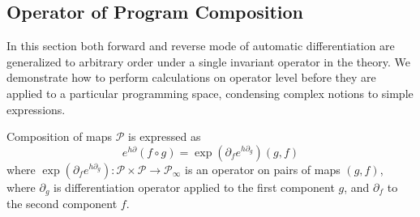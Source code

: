 \documentclass[11pt]{article}
\newcommand{\dP}{\mathcal{P}}
\newcommand{\D}{\partial}
\begin{document}
\subsection{Operator of Program Composition}\label{sec:compsition}
 
 In this section both forward \citep[e.g,][]{PcAD} and reverse \citep[e.g.,][]{ReverseAD} mode of
 automatic differentiation are generalized to arbitrary order under a single
 invariant operator in the theory. We demonstrate how to perform calculations on
 operator level before they are applied to a particular 
 programming space, condensing complex notions to simple expressions.  
 
 \begin{theorem}\label{izr:kompo}
 Composition of maps $\dP$ is expressed as
 \begin{equation}\label{eq:kompo}
 e^{h\D}(f\circ g)=\exp(\D_fe^{h\D_g})(g,f)
 \end{equation}
 where $\exp(\D_fe^{h\D_g}):\dP\times\dP\to\dP_\infty$ is an operator on pairs
 of maps $(g,f)$, where $\D_g$ is differentiation operator applied to the first
 component $g$, and $\D_f$ to the second component $f$. 
 \end{theorem}
 
\end{document}
